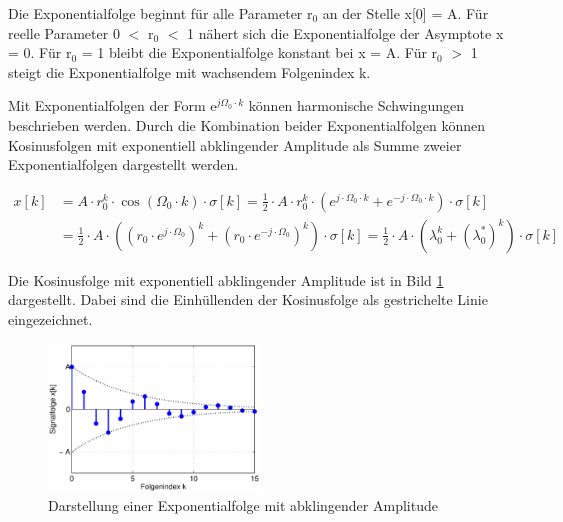 \noindent Die Exponentialfolge beginnt f\"{u}r alle Parameter r${}_{0}$ an der Stelle x[0] = A. F\"{u}r reelle Parameter 0 $\mathrm{<}$ r${}_{0}$ $\mathrm{<}$ 1 n\"{a}hert sich die Exponentialfolge der Asymptote x = 0. F\"{u}r r${}_{0}$ = 1 bleibt die Exponentialfolge konstant bei x = A. F\"{u}r r${}_{0}$ $\mathrm{>}$ 1 steigt die Exponentialfolge mit wachsendem Folgenindex k.

\noindent Mit Exponentialfolgen der Form e$^{j\Omega_{0}\cdot k}$ k\"{o}nnen harmonische Schwingungen beschrieben werden. Durch die Kombination beider Exponentialfolgen k\"{o}nnen Kosinusfolgen mit exponentiell abklingender Amplitude als Summe zweier Exponentialfolgen dargestellt werden. 

\begin{equation}\label{eq:threesixtytwo}
\begin{split}
x\left[k\right] & = A\cdot r_{0}^{k} \cdot \cos \left(\Omega _{0} \cdot k\right)\cdot \sigma \left[k\right]=\frac{1}{2} \cdot A\cdot r_{0}^{k} \cdot \left(e^{j\cdot \Omega _{0} \cdot k} +e^{-j\cdot \Omega _{0} \cdot k} \right)\cdot \sigma \left[k\right]\\ 
& = \frac{1}{2} \cdot A\cdot \left(\left(r_{0} \cdot e^{j\cdot \Omega _{0} } \right)^{k} +\left(r_{0} \cdot e^{-j\cdot \Omega _{0} } \right)^{k} \right)\cdot \sigma \left[k\right]=\frac{1}{2} \cdot A\cdot \left(\lambda _{0}^{k} +\left(\lambda _{0}^{*} \right)^{k} \right)\cdot \sigma \left[k\right]
\end{split}
\end{equation}

\noindent Die Kosinusfolge mit exponentiell abklingender Amplitude ist in Bild \ref{fig:ExponentialFolgeunabkAmp} dargestellt. Dabei sind die Einh\"{u}llenden der Kosinusfolge als gestrichelte Linie eingezeichnet.

\clearpage

\begin{figure}[H]
  \centerline{\includegraphics[width=0.5\textwidth]{Kapitel3/Bilder/image23.eps}}
  \caption{Darstellung einer Exponentialfolge mit abklingender Amplitude}
  \label{fig:ExponentialFolgeunabkAmp}
\end{figure}

